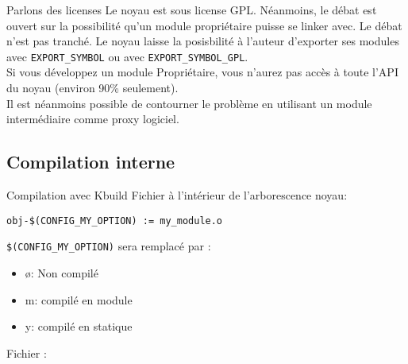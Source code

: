 \begin{frame}[fragile=singleslide]{Parlons des licenses}
  Le noyau est sous license GPL. Néanmoins, le débat est ouvert sur la
  possibilité  qu'un module  propriétaire puisse  se linker  avec.  Le
  débat n'est pas  tranché. Le noyau laisse la  posisbilité à l'auteur
  d'exporter   ses   modules   avec   \verb+EXPORT_SYMBOL+   ou   avec
  \verb+EXPORT_SYMBOL_GPL+.
\\[2ex]
  Si vous développez un module Propriétaire, vous n'aurez pas accès à
  toute l'API du noyau (environ 90\% seulement).
\\[2ex]
  Il est néanmoins possible de contourner le problème en utilisant un
  module intermédiaire comme proxy logiciel.
\end{frame}

\subsection{Compilation interne}

\begin{frame}[fragile=singleslide]{Compilation avec Kbuild}
  Fichier  à l'intérieur de l'arborescence noyau:
  \begin{lstlisting}
obj-$(CONFIG_MY_OPTION) := my_module.o
  \end{lstlisting} %
  \lstinline+$(CONFIG_MY_OPTION)+ sera remplacé par :
  \begin{itemize}
  \item ø: Non compilé
  \item m: compilé en module
  \item y: compilé en statique
  \end{itemize}
  Fichier :
  
\end{frame}

